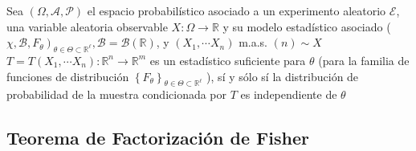 \begin{definición}
Sea $(\Omega, \mathcal{A}, \mathcal{P})$ el espacio probabilístico asociado a un experimento aleatorio $\mathcal{E}$, una variable aleatoria observable $X: \Omega \longrightarrow \mathbb{R}$ y su modelo estadístico asociado ( $\left.\chi, \mathcal{B}, F_{\theta}\right)_{\theta \in \Theta \subset \mathbb{R}^{\ell}}, \mathcal{B}=\mathcal{B}(\mathbb{R})$, y $\left(X_{1}, \cdots X_{n}\right)$ m.a.s. $(n) \sim X$\\
$T=T\left(X_{1}, \cdots X_{n}\right): \mathbb{R}^{n} \longrightarrow \mathbb{R}^{m}$ es un estadístico suficiente para $\theta$ (para la familia de funciones de distribución $\left\{F_{\theta}\right\}_{\theta \in \Theta \subset \mathbb{R}^{\ell}}$ ), sí y sólo sí la distribución de probabilidad de la muestra condicionada por $T$ es independiente de $\theta$
\end{definición}



\subsection*{Teorema de Factorización de Fisher}

